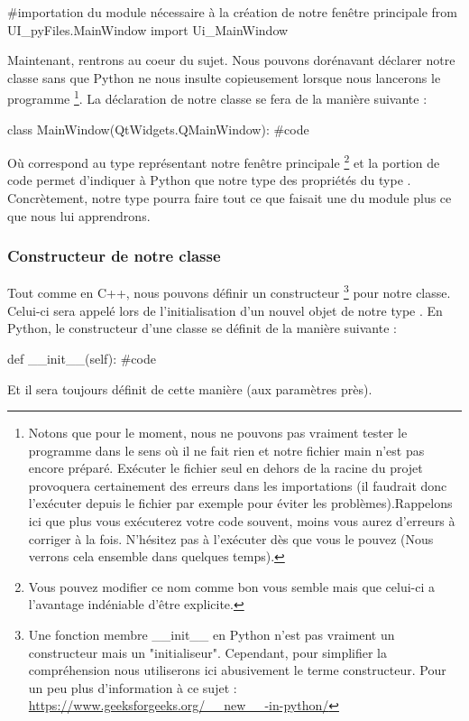 {\begin{Python}
#importation du module nécessaire à la création de notre fenêtre principale
from UI_pyFiles.MainWindow import Ui_MainWindow
\end{Python}


Maintenant, rentrons au coeur du sujet. Nous pouvons dorénavant déclarer notre classe sans que Python ne nous insulte copieusement lorsque nous lancerons le programme
\footnote{Notons que pour le moment, nous ne pouvons pas vraiment tester le programme dans le sens où il ne fait rien et notre fichier main n'est pas encore préparé. Exécuter le fichier seul en dehors de la racine du projet provoquera certainement des erreurs dans les importations (il faudrait donc l'exécuter depuis le fichier  par exemple pour éviter les problèmes).\newline Rappelons ici que plus vous exécuterez votre code souvent, moins vous aurez d'erreurs à corriger à la fois. N'hésitez pas à l'exécuter dès que vous le pouvez (Nous verrons cela ensemble dans quelques temps).}.\newline
La déclaration de notre classe se fera de la manière suivante :
\begin{Python}
class MainWindow(QtWidgets.QMainWindow):
    #code
\end{Python}
Où  correspond au type représentant notre fenêtre principale
\footnote
{Vous pouvez modifier ce nom comme bon vous semble mais que celui-ci a l'avantage indéniable d'être explicite.}
et la portion de code  permet d'indiquer à Python que notre type   des propriétés du type .\newline
Concrètement, notre type pourra faire tout ce que faisait une  du module  plus ce que nous lui apprendrons.


\subsubsection{Constructeur de notre classe}

Tout comme en C++, nous pouvons définir un constructeur
\footnote{Une fonction membre \_\_init\_\_ en Python n'est pas vraiment un constructeur mais un "initialiseur". Cependant, pour simplifier la compréhension nous utiliserons ici abusivement le terme constructeur. Pour un peu plus d'information à ce sujet : \url{https://www.geeksforgeeks.org/__new__-in-python/}}
pour notre classe. Celui-ci sera appelé lors de l'initialisation d'un nouvel objet de notre type .\newline
En Python, le constructeur d'une classe se définit de la manière suivante :
\begin{Python}
def __init__(self):
    #code
\end{Python}
Et il sera toujours définit de cette manière (aux paramètres près).\\

}
